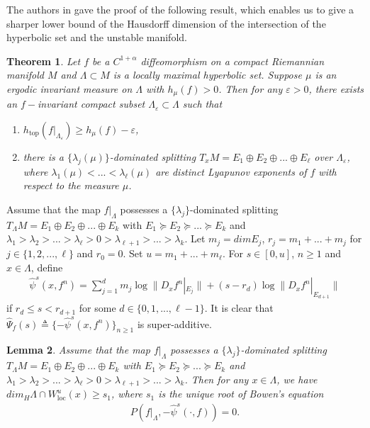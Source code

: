 \documentclass[11pt,a4paper]{amsart}
\theoremstyle{plain}
\newtheorem{Thm}{Theorem}[section]
\newtheorem{Lem}[Thm]{Lemma}
\theoremstyle{remark}
\begin{document}
	The authors in \cite{ACW} gave the proof of the following result, which enables us to give a sharper lower bound of the Hausdorff dimension of the intersection of the hyperbolic set and the unstable manifold.
	\begin{Thm}\cite{ACW}\label{Katok}
		Let $f$ be a $C^{1+\alpha}$ diffeomorphism on a compact Riemannian manifold $M$ and $\Lambda\subset M$ is a locally maximal hyperbolic set. Suppose $\mu$ is an ergodic invariant measure on $\Lambda$ with $h_{\mu}(f)>0$. Then for any $\varepsilon>0$, there exists an $f-$invariant compact subset $\Lambda_{\varepsilon}\subset \Lambda$ such that
		\begin{enumerate}
			\item $h_{\text{top}}(f|_{\Lambda_{\varepsilon}})\geq h_{\mu}(f)-\varepsilon$,
			\item there is  a $\{\lambda_{j}(\mu)\}$-dominated splitting $T_{x}M=E_{1}\oplus E_{2}\oplus...\oplus E_{\ell}$ over $\Lambda_{\varepsilon}$, where $\lambda_{1}(\mu)<...<\lambda_{\ell}(\mu)$ are distinct Lyapunov exponents of $f$ with respect to the measure $\mu$.
		\end{enumerate}
	\end{Thm}
	
	
	
	
	Assume that the map $f|_{\Lambda}$ possesses a $\{\lambda_{j}\}$-dominated splitting $T_{\Lambda}M=E_{1}\oplus E_{2}\oplus...\oplus E_{k}$ with $E_{1}\succeq E_{2}\succeq ...\succeq E_{k}$ and $\lambda_{1}>\lambda_{2}>...>\lambda_{\ell}>0>\lambda_{\ell+1}>...>\lambda_{k}$. Let $m_{j}=dim E_{j}$, $r_{j}=m_{1}+...+m_{j}$ for $j\in\{1,2,...,\ell\}$ and $r_{0}=0$. Set $u=m_{1}+...+m_{\ell}$. For $s\in [0,u]$, $n\geq 1$ and $x\in \Lambda$, define
	\begin{align*}
		\hat{\psi}^{s}(x,f^{n})=\sum_{j=1}^{d}m_{j}\log\|D_{x}f^{n}|_{E_{j}}\|+(s-r_{d})\log\|D_{x}f^{n}|_{E_{d+1}}\|
	\end{align*}
	if $r_{d}\leq s<r_{d+1}$ for some $d\in \{0,1,...,\ell-1\}$. It is clear that $\hat{\Psi}_{f}(s)\triangleq \{-\hat{\psi}^{s}(x,f^{n})\}_{n\geq 1}$ is super-additive.
	
	
	\begin{Lem}\label{lower bound 1}
		Assume that the map $f|_{\Lambda}$ possesses a $\{\lambda_{j}\}$-dominated splitting $T_{\Lambda}M=E_{1}\oplus E_{2}\oplus...\oplus E_{k}$ with $E_{1}\succeq E_{2}\succeq ...\succeq E_{k}$ and $\lambda_{1}>\lambda_{2}>...>\lambda_{\ell}>0>\lambda_{\ell+1}>...>\lambda_{k}$. Then for any $x\in \Lambda$, we have $dim_{H}\Lambda\cap W^{u}_{\text{loc}}(x)\geq s_{1}$, where $s_{1}$ is the unique root of Bowen's equation
		\begin{align*}
			P(f|_{\Lambda},-\hat{\psi}^{s}(\cdot,f))=0.
		\end{align*}
	\end{Lem}
	
\end{document}
